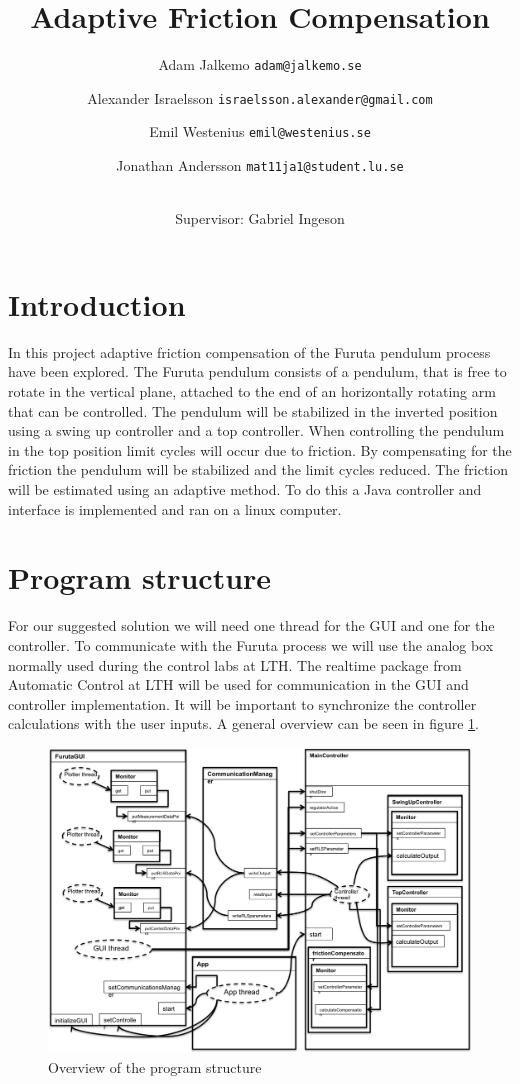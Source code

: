 \documentclass[10pt,a4paper]{article}
\author{Adam Jalkemo \texttt{adam@jalkemo.se} \and
Alexander Israelsson \texttt{israelsson.alexander@gmail.com} \and
Emil Westenius \texttt{emil@westenius.se} \and
Jonathan Andersson \texttt{mat11ja1@student.lu.se}
\and 
\\
Supervisor: Gabriel Ingeson}
\begin{document}
\title{Adaptive Friction Compensation}

\maketitle
\pagebreak
\section{Introduction}
In this project adaptive friction compensation of the Furuta pendulum process have been explored. The Furuta pendulum consists of a pendulum, that is free to rotate in the vertical plane, attached to the end of an horizontally rotating arm that can be controlled. The pendulum will be stabilized in the inverted position using a swing up controller and a top controller. When controlling the pendulum in the top position limit cycles will occur due to friction. By compensating for the friction the pendulum will be stabilized and the limit cycles reduced. The friction will be estimated using an adaptive method. To do this a Java controller and interface is implemented and ran on a linux computer.
\section{Program structure}
For our suggested solution we will need one thread for the GUI and one for the controller. To communicate with the Furuta process we will use the analog box normally used during the control labs at LTH. The realtime package from Automatic Control at LTH will be used for communication in the GUI and controller implementation. It will be important to synchronize the controller calculations with the user inputs. A general overview can be seen in figure \ref{fig:uml}.

\begin{figure}[!htb]
\centering
\includegraphics[width=1\textwidth]{notUml.png}
\caption{Overview of the program structure}
\label{fig:uml}
\end{figure}
\end{document}
